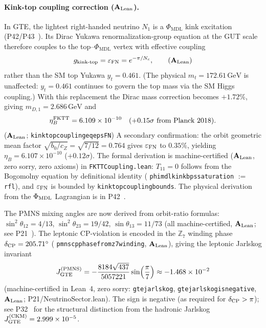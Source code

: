 \documentclass[11pt]{article}
\theoremstyle{remark}
\newcommand{\PHIMDL}{\Phi_{\mathrm{MDL}}}
\newcommand{\lean}[1]{%
  \penalty-100
  \begingroup\def\_{\textunderscore\allowbreak}\texttt{#1}\endgroup}
\newcommand{\CatAL}{\ensuremath{\textbf{A}_{\rm Lean}}}
\begin{document}
\paragraph{Kink-top coupling correction (\CatAL).}
In GTE, the lightest right-handed neutrino $N_1$ is a $\PHIMDL$ kink excitation
(P42/P43~\cite{SpivackPhiMDLField,SpivackCompleteness}).
Its Dirac Yukawa renormalization-group equation at the GUT scale therefore
couples to the top--$\PHIMDL$ vertex with effective coupling
\begin{equation}\label{eq:fktt}
g_{\rm kink\text{-}top} = \varepsilon_{\rm FN} = e^{-\pi/N_c}, \qquad (\CatAL)
\end{equation}
rather than the SM top Yukawa $y_t = 0.461$.
(The physical $m_t = 172.61\,\text{GeV}$ is unaffected: $y_t = 0.461$ continues
to govern the top mass via the SM Higgs coupling.)
With this replacement the Dirac mass correction becomes $+1.72\%$, giving
$m_{D,1} = 2.686\,\text{GeV}$ and
\begin{equation}\label{eq:etaB_FKTT}
\eta_B^{\rm FKTT} = 6.109\times10^{-10} \quad (+0.15\sigma\ \text{from Planck 2018}).
\end{equation}
(\CatAL; \lean{kink\_top\_coupling\_eq\_eps\_FN})
A secondary confirmation: the orbit geometric mean factor
$\sqrt{b_0/c_Z} = \sqrt{7/12} = 0.764$ gives $\varepsilon_{\rm FN}$ to $0.35\%$,
yielding $\eta_B = 6.107\times10^{-10}$ ($+0.12\sigma$).
The formal derivation is machine-certified (\CatAL, zero sorry, zero axioms) in \lean{FKTTCoupling.lean}:
$T_{11}=0$ follows from the Bogomolny equation by definitional identity
(\lean{phi\_mdl\_kink\_bps\_saturation} $:= $ \lean{rfl}), and $\varepsilon_{\rm FN}$
is bounded by \lean{kink\_top\_coupling\_bounds}.
The physical derivation from the $\Phi_{\rm MDL}$ Lagrangian is in P42~\cite{SpivackPhiMDLField}.

The PMNS mixing angles are now derived from orbit-ratio formulas: $\sin^2\theta_{12}=4/13$,
$\sin^2\theta_{23}=19/42$, $\sin\theta_{13}=11/73$ (all machine-certified, \CatAL;
see P21~\cite{SpivackNeutrino}).
The leptonic CP-violation is encoded in the $\mathbb{Z}_7$ winding phase
$\delta_{\rm CP} = 205.71^\circ$ (\lean{pmns\_cp\_phase\_from\_z7\_winding}, \CatAL),
giving the leptonic Jarlskog invariant
\begin{equation}
  J_{\rm GTE}^{(\rm PMNS)} = -\frac{8184\sqrt{437}}{5057221}\sin\!\left(\frac{\pi}{7}\right)
  \approx -1.468\times10^{-2}
\end{equation}
(machine-certified in Lean~4, zero sorry: \lean{gte\_jarlskog},
\lean{gte\_jarlskog\_is\_negative}, \CatAL; P21/NeutrinoSector.lean).  The sign is negative (as required for $\delta_{\rm CP}>\pi$);
see P32~\cite{SpivackCKM} for the structural distinction from the hadronic Jarlskog
$J_{\rm GTE}^{(\rm CKM)} = 2.999\times10^{-5}$.
\end{document}
